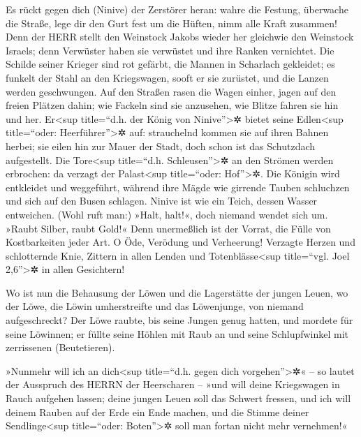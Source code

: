  Es rückt gegen dich (Ninive) der Zerstörer heran: wahre
die Festung, überwache die Straße, lege dir den Gurt fest um die Hüften,
nimm alle Kraft zusammen!  Denn der HERR stellt den
Weinstock Jakobs wieder her gleichwie den Weinstock Israels; denn
Verwüster haben sie verwüstet und ihre Ranken vernichtet. 
Die Schilde seiner Krieger sind rot gefärbt, die Mannen in Scharlach
gekleidet; es funkelt der Stahl an den Kriegswagen, sooft er sie
zurüstet, und die Lanzen werden geschwungen.  Auf den
Straßen rasen die Wagen einher, jagen auf den freien Plätzen dahin; wie
Fackeln sind sie anzusehen, wie Blitze fahren sie hin und her.
 Er\textless sup title=``d.h. der König von
Ninive''\textgreater✲ bietet seine Edlen\textless sup title=``oder:
Heerführer''\textgreater✲ auf: strauchelnd kommen sie auf ihren Bahnen
herbei; sie eilen hin zur Mauer der Stadt, doch schon ist das Schutzdach
aufgestellt.  Die Tore\textless sup title=``d.h.
Schleusen''\textgreater✲ an den Strömen werden erbrochen: da verzagt der
Palast\textless sup title=``oder: Hof''\textgreater✲.  Die
Königin wird entkleidet und weggeführt, während ihre Mägde wie girrende
Tauben schluchzen und sich auf den Busen schlagen.  Ninive
ist wie ein Teich, dessen Wasser entweichen. (Wohl ruft man:) »Halt,
halt!«, doch niemand wendet sich um.  »Raubt Silber,
raubt Gold!« Denn unermeßlich ist der Vorrat, die Fülle von
Kostbarkeiten jeder Art.  O Öde, Verödung und Verheerung!
Verzagte Herzen und schlotternde Knie, Zittern in allen Lenden und
Totenblässe\textless sup title=``vgl. Joel 2,6''\textgreater✲ in allen
Gesichtern!

 Wo ist nun die Behausung der Löwen und die Lagerstätte
der jungen Leuen, wo der Löwe, die Löwin umherstreifte und das
Löwenjunge, von niemand aufgeschreckt?  Der Löwe raubte,
bis seine Jungen genug hatten, und mordete für seine Löwinnen; er füllte
seine Höhlen mit Raub an und seine Schlupfwinkel mit zerrissenen
(Beutetieren).

 »Nunmehr will ich an dich\textless sup title=``d.h.
gegen dich vorgehen''\textgreater✲« -- so lautet der Ausspruch des HERRN
der Heerscharen -- »und will deine Kriegswagen in Rauch aufgehen lassen;
deine jungen Leuen soll das Schwert fressen, und ich will deinem Rauben
auf der Erde ein Ende machen, und die Stimme deiner
Sendlinge\textless sup title=``oder: Boten''\textgreater✲ soll man
fortan nicht mehr vernehmen!«

